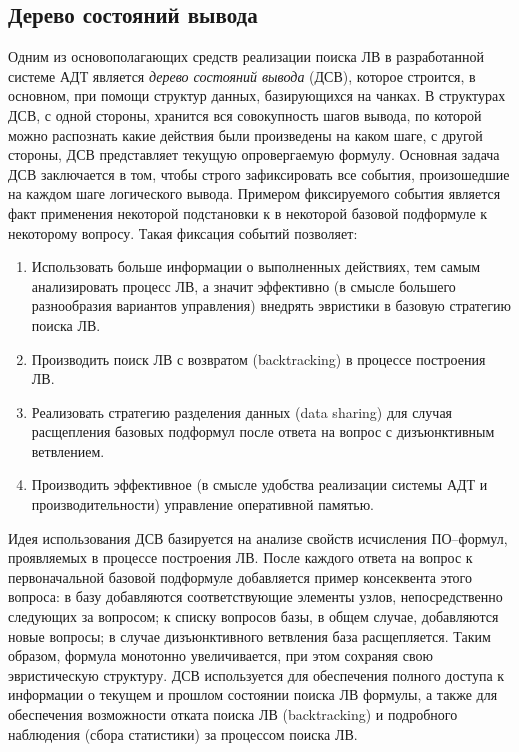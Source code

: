 \subsection{Дерево состояний вывода}
Одним из основополагающих средств реализации поиска ЛВ в разработанной системе АДТ является \emph{дерево состояний вывода} (ДСВ), которое строится, в основном, при помощи структур данных, базирующихся на чанках. В структурах ДСВ, с одной стороны, хранится вся совокупность шагов вывода, по которой можно распознать какие действия были произведены на каком шаге, с другой стороны, ДСВ представляет текущую опровергаемую формулу. Основная задача ДСВ заключается в том, чтобы строго зафиксировать все события, произошедшие на каждом шаге логического вывода. Примером фиксируемого события является факт применения некоторой подстановки к в некоторой базовой подформуле к некоторому вопросу. Такая фиксация событий позволяет:
\begin{enumerate}
 \item Использовать больше информации о выполненных действиях, тем самым анализировать процесс ЛВ, а значит эффективно (в смысле большего разнообразия вариантов управления) внедрять эвристики в базовую стратегию поиска ЛВ.
 \item Производить поиск ЛВ с возвратом (backtracking) в процессе построения ЛВ.
 \item Реализовать стратегию разделения данных (data sharing) для случая расщепления базовых подформул после ответа на вопрос с дизъюнктивным ветвлением.
 \item Производить эффективное (в смысле удобства реализации системы АДТ и производительности) управление оперативной памятью.
\end{enumerate}

Идея использования ДСВ базируется на анализе свойств исчисления ПО--формул, проявляемых в процессе построения ЛВ. После каждого ответа на вопрос к первоначальной базовой подформуле добавляется пример консеквента этого вопроса: в базу добавляются соответствующие элементы узлов, непосредственно следующих за вопросом; к списку вопросов базы, в общем случае, добавляются новые вопросы; в случае дизъюнктивного ветвления база расщепляется. Таким образом, формула монотонно увеличивается, при этом сохраняя свою эвристическую структуру. ДСВ используется для обеспечения полного доступа к информации о текущем и прошлом состоянии поиска ЛВ формулы, а также для обеспечения возможности отката поиска ЛВ (backtracking) и подробного наблюдения (сбора статистики) за процессом поиска ЛВ.

